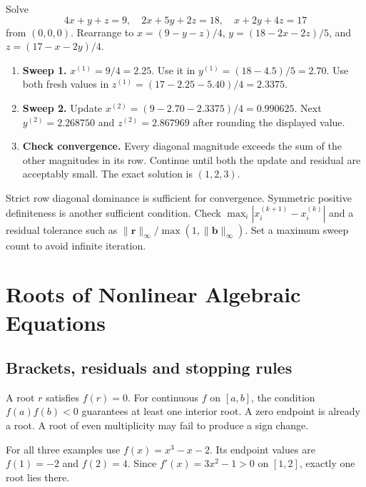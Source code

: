 \documentclass[12pt,a4paper]{article}
\begin{document}
\begin{tcolorbox}[examplebox, title={Two sweeps of Gauss--Seidel}]
Solve
\[
4x+y+z=9,\quad 2x+5y+2z=18,\quad x+2y+4z=17
\]
from $(0,0,0)$. Rearrange to $x=(9-y-z)/4$, $y=(18-2x-2z)/5$, and $z=(17-x-2y)/4$.
\begin{enumerate}[leftmargin=*, itemsep=3pt, topsep=4pt]
  \item \textbf{Sweep 1.} $x^{(1)}=9/4=2.25$. Use it in $y^{(1)}=(18-4.5)/5=2.70$. Use both fresh values in $z^{(1)}=(17-2.25-5.40)/4=2.3375$.
  \item \textbf{Sweep 2.} Update $x^{(2)}=(9-2.70-2.3375)/4=0.990625$. Next $y^{(2)}=2.268750$ and $z^{(2)}=2.867969$ after rounding the displayed value.
  \item \textbf{Check convergence.} Every diagonal magnitude exceeds the sum of the other magnitudes in its row. Continue until both the update and residual are acceptably small. The exact solution is $(1,2,3)$.
\end{enumerate}
\end{tcolorbox}

Strict row diagonal dominance is sufficient for convergence. Symmetric positive definiteness is another sufficient condition. Check $\max_i|x_i^{(k+1)}-x_i^{(k)}|$ and a residual tolerance such as $\|\mathbf{r}\|_\infty/\max(1,\|\mathbf{b}\|_\infty)$. Set a maximum sweep count to avoid infinite iteration.

\section{Roots of Nonlinear Algebraic Equations}
\subsection{Brackets, residuals and stopping rules}
\begin{tcolorbox}[defbox, title={Root and sign-changing bracket}]
A root $r$ satisfies $f(r)=0$. For continuous $f$ on $[a,b]$, the condition $f(a)f(b)<0$ guarantees at least one interior root. A zero endpoint is already a root. A root of even multiplicity may fail to produce a sign change.
\end{tcolorbox}

For all three examples use $f(x)=x^3-x-2$. Its endpoint values are $f(1)=-2$ and $f(2)=4$. Since $f'(x)=3x^2-1>0$ on $[1,2]$, exactly one root lies there.
\end{document}
